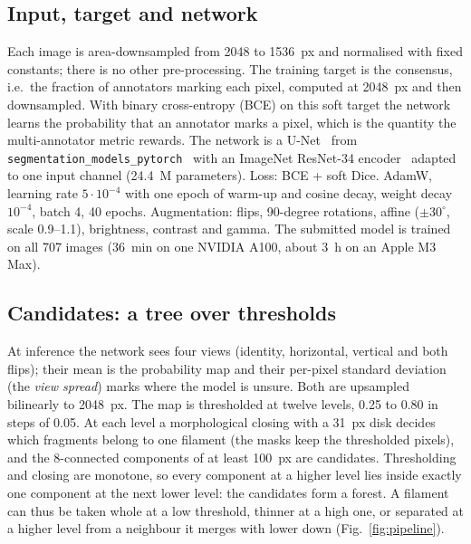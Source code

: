 \documentclass[sigconf]{acmart}
\begin{document}
\subsection{Input, target and network}
Each image is area-downsampled from 2048 to 1536~px and normalised with fixed constants; there is no other pre-processing. The training target is the consensus, i.e.\ the fraction of annotators marking each pixel, computed at 2048~px and then downsampled. With binary cross-entropy (BCE) on this soft target the network learns the probability that an annotator marks a pixel, which is the quantity the multi-annotator metric rewards. The network is a U-Net~\cite{unet} from \texttt{segmentation\_models\_pytorch}~\cite{smp} with an ImageNet ResNet-34 encoder~\cite{resnet} adapted to one input channel (24.4~M parameters). Loss: BCE + soft Dice. AdamW, learning rate $5\cdot10^{-4}$ with one epoch of warm-up and cosine decay, weight decay $10^{-4}$, batch 4, 40 epochs. Augmentation: flips, 90-degree rotations, affine ($\pm30^\circ$, scale 0.9--1.1), brightness, contrast and gamma. The submitted model is trained on all 707 images (36~min on one NVIDIA A100, about 3~h on an Apple M3 Max).

\subsection{Candidates: a tree over thresholds}
At inference the network sees four views (identity, horizontal, vertical and both flips); their mean is the probability map and their per-pixel standard deviation (the \emph{view spread}) marks where the model is unsure. Both are upsampled bilinearly to 2048~px. The map is thresholded at twelve levels, 0.25 to 0.80 in steps of 0.05. At each level a morphological closing with a 31~px disk decides which fragments belong to one filament (the masks keep the thresholded pixels), and the 8-connected components of at least 100~px are candidates. Thresholding and closing are monotone, so every component at a higher level lies inside exactly one component at the next lower level: the candidates form a forest. A filament can thus be taken whole at a low threshold, thinner at a high one, or separated at a higher level from a neighbour it merges with lower down (Fig.~\ref{fig:pipeline}).
\end{document}
